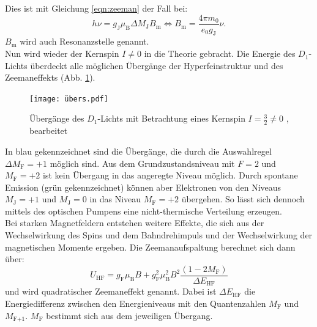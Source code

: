 Dies ist mit Gleichung \eqref{eqn:zeeman} der Fall bei:
\begin{equation}
  h \nu = g_{\text{J}} \mu_{\text{B}} \Delta M_{\text{J}} B_{\text{m}} \Leftrightarrow B_{\text{m}} = \frac{4 \pi m_{0}}{e_{0} g_{\text{J}}} \nu.
\label{eqn:resonanz}
\end{equation}
$B_{\text{m}}$ wird auch Resonanzstelle genannt.
%
%
\\Nun wird wieder der Kernspin $I≠0$ in die Theorie gebracht.
Die Energie des $D_{1}$-Lichts überdeckt alle möglichen Übergänge der Hyperfeinstruktur und des Zeemaneffekts (Abb. \ref{fig:übergänge}).
\begin{figure}[h!]
  \centering
  \texttt{[image: übers.pdf]}
  \caption{Übergänge des $D_{1}$-Lichts mit Betrachtung eines Kernspin $I=\frac{3}{2}≠0$ \cite{1}, bearbeitet}
  \label{fig:übergänge}
\end{figure}
In blau gekennzeichnet sind die Übergänge, die durch die Auswahlregel $\Delta M_{\text{F}}=+1$ möglich sind.
Aus dem Grundzustandsniveau mit $F=2$ und $M_{\text{F}}=+2$ ist kein Übergang in das angeregte Niveau möglich.
Durch spontane Emission (grün gekennzeichnet) können aber Elektronen von den Niveaus $M_{\text{J}}=+1$ und $M_{\text{J}}=0$ in das Niveau $M_{\text{F}}=+2$ übergehen.
So lässt sich dennoch mittels des optischen Pumpens eine nicht-thermische Verteilung erzeugen.
%
%
\\Bei starken Magnetfeldern entstehen weitere Effekte, die sich aus der Wechselwirkung des Spins und dem Bahndrehimpuls und der Wechselwirkung der magnetischen Momente ergeben.
Die Zeemanaufspaltung berechnet sich dann über:
\begin{equation}
U_{\text{HF}}= g_{\text{F}} \mu_{\text{B}} B + g_{\text{F}}^2 \mu_{\text{B}}^2 B^2 \frac{(1- 2M_{\text{F}})}{\Delta E_{\text{HF}}}
\label{eqn:quadzeeman}
\end{equation}
und wird quadratischer Zeemaneffekt genannt.
Dabei ist $\Delta E_{\text{HF}}$ die Energiedifferenz zwischen den Energieniveaus mit den Quantenzahlen $M_{\text{F}}$ und $M_{\text{F+1}}$.
$M_{\text{F}}$ bestimmt sich aus dem jeweiligen Übergang.
\FloatBarrier
